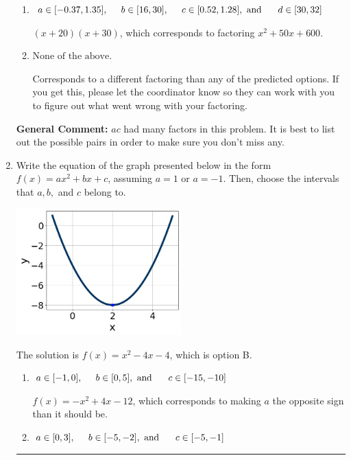 \documentclass{extbook}[14pt]
\newcommand{\litem}[1]{\item #1

\rule{\textwidth}{0.4pt}}
\begin{document}
\begin{enumerate}
{\begin{enumerate}[label=\Alph*.]
 $(12x + 5)(2x + 5)$, which corresponds to associating some factor of a to c.
\item \( a \in [-0.37, 1.35], \hspace*{5mm} b \in [16, 30], \hspace*{5mm} c \in [0.52, 1.28], \text{ and } \hspace*{5mm} d \in [30, 32] \)

 $(x + 20)(x + 30)$, which corresponds to factoring $x^{2} +50 x + 600$.
\item \( \text{None of the above.} \)

 Corresponds to a different factoring than any of the predicted options. If you get this, please let the coordinator know so they can work with you to figure out what went wrong with your factoring.
\end{enumerate}

\textbf{General Comment:} $ac$ had many factors in this problem. It is best to list out the possible pairs in order to make sure you don't miss any.
}
\litem{
Write the equation of the graph presented below in the form $f(x)=ax^2+bx+c$, assuming  $a=1$ or $a=-1$. Then, choose the intervals that $a, b,$ and $c$ belong to.

\begin{center}
    \includegraphics[width=0.5\textwidth]{../Figures/quadraticGraphToEquationB.png}
\end{center}


The solution is \( f(x) = x^{2} -4 x -4 \), which is option B.\begin{enumerate}[label=\Alph*.]
\item \( a \in [-1, 0], \hspace*{5mm} b \in [0, 5], \text{ and } \hspace*{5mm} c \in [-15, -10] \)

$f(x)=-x^{2} +4 x -12$, which corresponds to making $a$ the opposite sign than it should be.
\item \( a \in [0, 3], \hspace*{5mm} b \in [-5, -2], \text{ and } \hspace*{5mm} c \in [-5, -1] \)


\end{enumerate}}
\end{enumerate}
\end{document}
